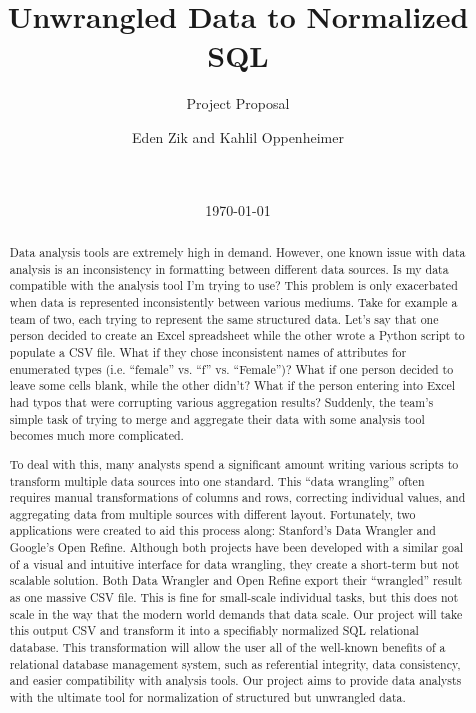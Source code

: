 \documentclass{../sty/acm_proc_article-sp}
\begin{document}
\title{Unwrangled Data to Normalized SQL}
\subtitle{Project Proposal}

\author{
\alignauthor
Eden Zik and Kahlil Oppenheimer\\
       \\
       \\
}

\date{\today}


\maketitle

\begin{abstract}

Data analysis tools are extremely high in demand. However, one known issue with data analysis is an inconsistency in formatting between different data sources. Is my data compatible with the analysis tool I'm trying to use? This problem is only exacerbated when data is represented inconsistently between various mediums. Take for example a team of two, each trying to represent the same structured data. Let's say that one person decided to create an Excel spreadsheet while the other wrote a Python script to populate a CSV file. What if they chose inconsistent names of attributes for enumerated types (i.e. ``female'' vs. ``f'' vs. ``Female'')? What if one person decided to leave some cells blank, while the other didn't? What if the person entering into Excel had typos that were corrupting various aggregation results? Suddenly, the team's simple task of trying to merge and aggregate their data with some analysis tool becomes much more complicated.

To deal with this, many analysts spend a significant amount writing various scripts to transform multiple data sources into one standard. This ``data wrangling'' often requires manual transformations of columns and rows, correcting individual values, and aggregating data from multiple sources with different layout. Fortunately, two applications were created to aid this process along: Stanford's Data Wrangler and Google's Open Refine. Although both projects have been developed with a similar goal of a visual and intuitive interface for data wrangling, they create a short-term but not scalable solution. Both Data Wrangler and Open Refine export their ``wrangled'' result as one massive CSV file. This is fine for small-scale individual tasks, but this does not scale in the way that the modern world demands that data scale. Our project will take this output CSV and transform it into a specifiably normalized SQL relational database. This transformation will allow the user all of the well-known benefits of a relational database management system, such as referential integrity, data consistency, and easier compatibility with analysis tools. Our project aims to provide data analysts with the ultimate tool for normalization of structured but unwrangled data.

\end{abstract}
\end{document}
